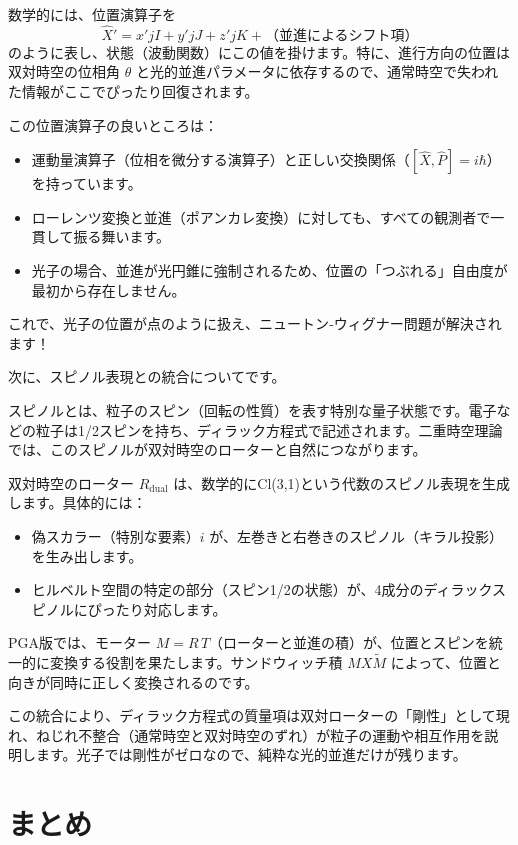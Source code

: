 \documentclass[dvipdfmx,a4paper,oneside]{jsbook}
\begin{document}
数学的には、位置演算子を
\[
\hat{X}' = x' jI + y' jJ + z' jK + \text{（並進によるシフト項）}
\]
のように表し、状態（波動関数）にこの値を掛けます。特に、進行方向の位置は双対時空の位相角 \(\theta\) と光的並進パラメータに依存するので、通常時空で失われた情報がここでぴったり回復されます。

この位置演算子の良いところは：
\begin{itemize}
  \item 運動量演算子（位相を微分する演算子）と正しい交換関係（\([\hat{X}, \hat{P}] = i\hbar\)）を持っています。
  \item ローレンツ変換と並進（ポアンカレ変換）に対しても、すべての観測者で一貫して振る舞います。
  \item 光子の場合、並進が光円錐に強制されるため、位置の「つぶれる」自由度が最初から存在しません。
\end{itemize}

これで、光子の位置が点のように扱え、ニュートン‐ウィグナー問題が解決されます！

次に、スピノル表現との統合についてです。

スピノルとは、粒子のスピン（回転の性質）を表す特別な量子状態です。電子などの粒子は1/2スピンを持ち、ディラック方程式で記述されます。二重時空理論では、このスピノルが双対時空のローターと自然につながります。

双対時空のローター \(R_{\text{dual}}\) は、数学的にCl(3,1)という代数のスピノル表現を生成します。具体的には：
\begin{itemize}
  \item 偽スカラー（特別な要素）\(i\) が、左巻きと右巻きのスピノル（キラル投影）を生み出します。
  \item ヒルベルト空間の特定の部分（スピン1/2の状態）が、4成分のディラックスピノルにぴったり対応します。
\end{itemize}

PGA版では、モーター \(M = R\, T\)（ローターと並進の積）が、位置とスピンを統一的に変換する役割を果たします。サンドウィッチ積 \(M X \widetilde{M}\) によって、位置と向きが同時に正しく変換されるのです。

この統合により、ディラック方程式の質量項は双対ローターの「剛性」として現れ、ねじれ不整合（通常時空と双対時空のずれ）が粒子の運動や相互作用を説明します。光子では剛性がゼロなので、純粋な光的並進だけが残ります。

\section{まとめ}
\end{document}
